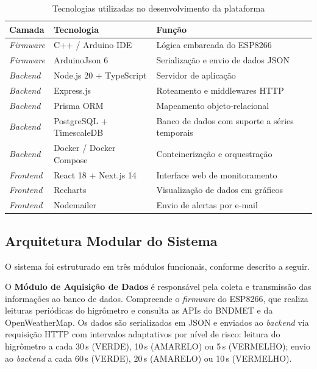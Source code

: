 \begin{table}[htb]
\centering
\caption{Tecnologias utilizadas no desenvolvimento da plataforma}
\label{tab:tecnologias}
\begin{tabular}{lll}
\hline
\textbf{Camada}       & \textbf{Tecnologia}               & \textbf{Função}                           \\
\hline
\textit{Firmware}     & C++ / Arduino IDE                 & Lógica embarcada do ESP8266               \\
\textit{Firmware}     & ArduinoJson 6                     & Serialização e envio de dados JSON        \\
\textit{Backend}      & Node.js 20 + TypeScript           & Servidor de aplicação                     \\
\textit{Backend}      & Express.js                        & Roteamento e middlewares HTTP             \\
\textit{Backend}      & Prisma ORM                        & Mapeamento objeto-relacional              \\
\textit{Backend}      & PostgreSQL + TimescaleDB          & Banco de dados com suporte a séries temporais \\
\textit{Backend}      & Docker / Docker Compose           & Conteinerização e orquestração            \\
\textit{Frontend}     & React 18 + Next.js 14             & Interface web de monitoramento            \\
\textit{Frontend}     & Recharts                          & Visualização de dados em gráficos         \\
\textit{Frontend}     & Nodemailer                        & Envio de alertas por e-mail               \\
\hline
\end{tabular}
\end{table}

\subsection{Arquitetura Modular do Sistema}
\label{subsec:arquitetura}

O sistema foi estruturado em três módulos funcionais, conforme
descrito a seguir.

O \textbf{Módulo de Aquisição de Dados} é responsável pela coleta
e transmissão das informações ao banco de dados. Compreende o
\textit{firmware} do ESP8266, que realiza leituras periódicas do
higrômetro e consulta as APIs do BNDMET e da OpenWeatherMap. Os
dados são serializados em JSON e enviados ao \textit{backend} via
requisição HTTP com intervalos adaptativos por nível de risco: leitura
do higrômetro a cada 30\,s (VERDE), 10\,s (AMARELO) ou 5\,s
(VERMELHO); envio ao \textit{backend} a cada 60\,s (VERDE),
20\,s (AMARELO) ou 10\,s (VERMELHO).


